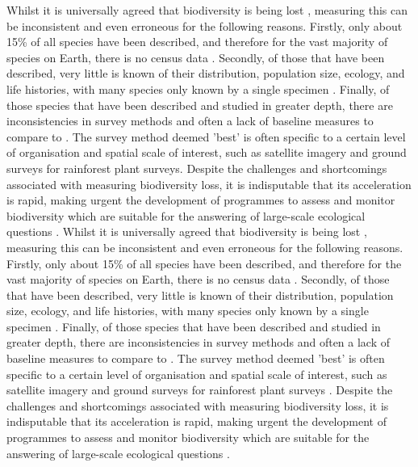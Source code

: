 Whilst it is universally agreed that biodiversity is being lost \citep{Cardinale2012, Ceballos2015, Fanin2018}, measuring this can be inconsistent and even erroneous \citep{Rocchini2018} for the following reasons. Firstly, only about 15\% of all species have been described, and therefore for the vast majority of species on Earth, there is no census data \citep{Chapman2009}. Secondly, of those that have been described, very little is known of their distribution, population size, ecology, and life histories, with many species only known by a single specimen \citep{Chapman2009}. Finally, of those species that have been described and studied in greater depth, there are inconsistencies in survey methods and often a lack of baseline measures to compare to \citep{TheRoy2003}.  The survey method deemed 'best' is often specific to a certain level of organisation and spatial scale of interest, such as satellite imagery and ground surveys for rainforest plant surveys. Despite the challenges and shortcomings associated with measuring biodiversity loss, it is indisputable that its acceleration is rapid, making urgent the development of programmes to assess and monitor biodiversity which are suitable for the answering of large-scale ecological questions \citep{Chiarucci2011, }.
Whilst it is universally agreed that biodiversity is being lost \citep{Cardinale2012, Ceballos2015, Fanin2018}, measuring this can be inconsistent and even erroneous \citep{Rocchini2018} for the following reasons. Firstly, only about 15\% of all species have been described, and therefore for the vast majority of species on Earth, there is no census data \citep{Chapman2009}. Secondly, of those that have been described, very little is known of their distribution, population size, ecology, and life histories, with many species only known by a single specimen \citep{Chapman2009}. Finally, of those species that have been described and studied in greater depth, there are inconsistencies in survey methods and often a lack of baseline measures to compare to \citep{TheRoy2003, Rocchini2018}.  The survey method deemed 'best' is often specific to a certain level of organisation and spatial scale of interest, such as satellite imagery and ground surveys for rainforest plant surveys \citep{Rocchini2018}. Despite the challenges and shortcomings associated with measuring biodiversity loss, it is indisputable that its acceleration is rapid, making urgent the development of programmes to assess and monitor biodiversity which are suitable for the answering of large-scale ecological questions \citep{Chiarucci2011, Rocchini2018}.


